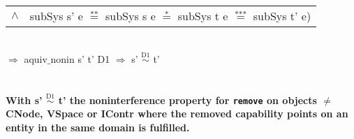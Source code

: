 \begin{itemize}
\begin{tabular}{ll}
$\wedge$ & subSys s' e $\overset{\text{**}}{=}$ subSys s e $\overset{\text{*}}{=}$ subSys t e $\overset{\text{***}}{=}$ subSys t' e)
\end{tabular} \\
$\Rightarrow$ aquiv$\_$nonin s' t' D1 $\Rightarrow$ s' $\overset{\text{D1}}{\sim}$ t' \\ \\ \\
\textbf{With s' $\overset{\text{D1}}{\sim}$ t' the noninterference property for \texttt{remove} on objects $\neq$ CNode, VSpace or IContr where the removed capability points on an entity in the same domain is fulfilled.}  
\end{itemize}